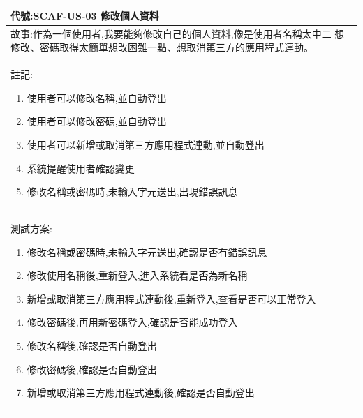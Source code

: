 \documentclass{report}
\begin{document}
\subsection*{}
\fontsize{12}{20}\selectfont
\begin{tabularx}{\textwidth}{|X|}
  \hline
  代號:SCAF-US-03 修改個人資料 \\
  \hline
  故事:作為一個使用者,我要能夠修改自己的個人資料,像是使用者名稱太中二
想修改、密碼取得太簡單想改困難一點、想取消第三方的應用程式連動。 \\
  \hline
  註記:
  \begin{enumerate}
    \item 使用者可以修改名稱,並自動登出
    \item 使用者可以修改密碼,並自動登出
    \item 使用者可以新增或取消第三方應用程式連動,並自動登出
    \item 系統提醒使用者確認變更
    \item 修改名稱或密碼時,未輸入字元送出,出現錯誤訊息
  \end{enumerate} \\
  \hline
  測試方案:
  \begin{enumerate}
    \item 修改名稱或密碼時,未輸入字元送出,確認是否有錯誤訊息
    \item 修改使用名稱後,重新登入,進入系統看是否為新名稱
    \item 新增或取消第三方應用程式連動後,重新登入,查看是否可以正常登入
    \item 修改密碼後,再用新密碼登入,確認是否能成功登入
    \item 修改名稱後,確認是否自動登出
    \item 修改密碼後,確認是否自動登出
    \item 新增或取消第三方應用程式連動後,確認是否自動登出
  \end{enumerate} \\
  \hline
\end{tabularx}
\end{document}
